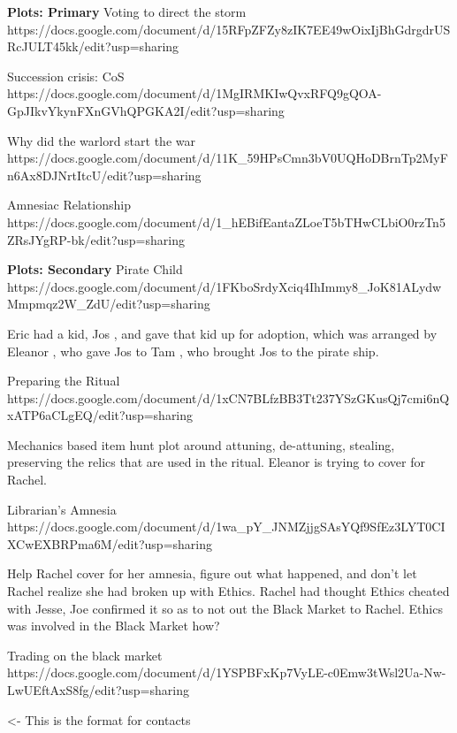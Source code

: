 \documentclass[char]{GL2020}
\begin{document}
\textbf{Plots: Primary}
Voting to direct the storm
https://docs.google.com/document/d/15RFpZFZy8zIK7EE49wOixIjBhGdrgdrUSRcJULT45kk/edit?usp=sharing

Succession crisis: CoS
https://docs.google.com/document/d/1MgIRMKIwQvxRFQ9gQOA-GpJIkvYkynFXnGVhQPGKA2I/edit?usp=sharing

Why did the warlord start the war
https://docs.google.com/document/d/11K_59HPsCmn3bV0UQHoDBrnTp2MyFn6Ax8DJNrtItcU/edit?usp=sharing

Amnesiac Relationship
https://docs.google.com/document/d/1_hEBifEantaZLoeT5bTHwCLbiO0rzTn5ZRsJYgRP-bk/edit?usp=sharing

\textbf{Plots: Secondary}
Pirate Child
https://docs.google.com/document/d/1FKboSrdyXciq4IhImmy8_JoK81ALydwMmpmqz2W_ZdU/edit?usp=sharing

Eric \cEvil{} had a kid, Jos \cPirateChild{}, and gave that kid up for adoption, which was arranged by Eleanor \cEthics{}, who gave Jos \cPirateChild{} to Tam \cPirate{}, who brought Jos \cPirateChild{} to the pirate ship.


Preparing the Ritual
https://docs.google.com/document/d/1xCN7BLfzBB3Tt237YSzGKusQj7cmi6nQxATP6aCLgEQ/edit?usp=sharing

Mechanics based item hunt plot around attuning, de-attuning, stealing, preserving the relics that are used in the ritual.  Eleanor is trying to cover for Rachel.

Librarian's Amnesia
https://docs.google.com/document/d/1wa_pY_JNMZjjgSAsYQf9SfEz3LYT0CIXCwEXBRPma6M/edit?usp=sharing

Help Rachel cover for her amnesia, figure out what happened, and don't let Rachel realize she had broken up with Ethics.  Rachel had thought Ethics cheated with Jesse, Joe confirmed it so as to not out the Black Market to Rachel.  Ethics was involved in the Black Market how?

Trading on the black market
https://docs.google.com/document/d/1YSPBFxKp7VyLE-c0Emw3tWsl2Ua-Nw-LwUEftAxS8fg/edit?usp=sharing

\begin{itemz}[Goals]
	\item 
\end{itemz}

\begin{itemz}[Notes]
	\item 
\end{itemz}

\begin{contacts}
	\contact{\cTest{}} <- This is the format for contacts 
\end{contacts}
\end{document}
